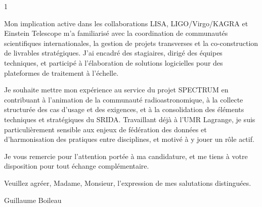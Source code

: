 \documentclass[10pt,a4paper]{altacv}
\begin{document}
\begin{paracol}{1}
{Mon implication active dans les collaborations LISA, LIGO/Virgo/KAGRA et Einstein Telescope m’a familiarisé avec la coordination de communautés scientifiques internationales, la gestion de projets transverses et la co-construction de livrables stratégiques. J’ai encadré des stagiaires, dirigé des équipes techniques, et participé à l’élaboration de solutions logicielles pour des plateformes de traitement à l’échelle.

Je souhaite mettre mon expérience au service du projet SPECTRUM en contribuant à l’animation de la communauté radioastronomique, à la collecte structurée des cas d’usage et des exigences, et à la consolidation des éléments techniques et stratégiques du SRIDA. Travaillant déjà à l’UMR Lagrange, je suis particulièrement sensible aux enjeux de fédération des données et d’harmonisation des pratiques entre disciplines, et motivé à y jouer un rôle actif.

Je vous remercie pour l’attention portée à ma candidature, et me tiens à votre disposition pour tout échange complémentaire.

\vspace{0.5cm}

Veuillez agréer, Madame, Monsieur, l’expression de mes salutations distinguées.

\vspace{0.5cm}

Guillaume Boileau

}


\end{paracol}
\end{document}
